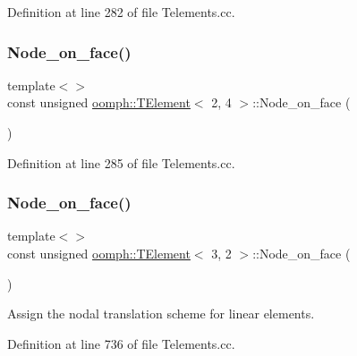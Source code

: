 Definition at line 282 of file Telements.\+cc.

\mbox{\label{classoomph_1_1TElement_a7b52ee28907f88f47df0505a14b32a42}} 
\subsubsection{\texorpdfstring{Node\+\_\+on\+\_\+face()}{Node\_on\_face()}\hspace{0.1cm}{\footnotesize\ttfamily [3/5]}}
{\footnotesize\ttfamily template$<$$>$ \\
const unsigned \hyperlink{classoomph_1_1TElement}{oomph\+::\+T\+Element}$<$ 2, 4 $>$\+::Node\+\_\+on\+\_\+face (\begin{DoxyParamCaption}{ }\end{DoxyParamCaption})}



Definition at line 285 of file Telements.\+cc.

\mbox{\label{classoomph_1_1TElement_a7e803bc4faef1a0e085fe1f556ecf3d2}} 
\subsubsection{\texorpdfstring{Node\+\_\+on\+\_\+face()}{Node\_on\_face()}\hspace{0.1cm}{\footnotesize\ttfamily [4/5]}}
{\footnotesize\ttfamily template$<$$>$ \\
const unsigned \hyperlink{classoomph_1_1TElement}{oomph\+::\+T\+Element}$<$ 3, 2 $>$\+::Node\+\_\+on\+\_\+face (\begin{DoxyParamCaption}{ }\end{DoxyParamCaption})}



Assign the nodal translation scheme for linear elements. 



Definition at line 736 of file Telements.\+cc.

\mbox{\label{classoomph_1_1TElement_aed8e8d56fa04ce419d0cc19e5c8c6111}} 
